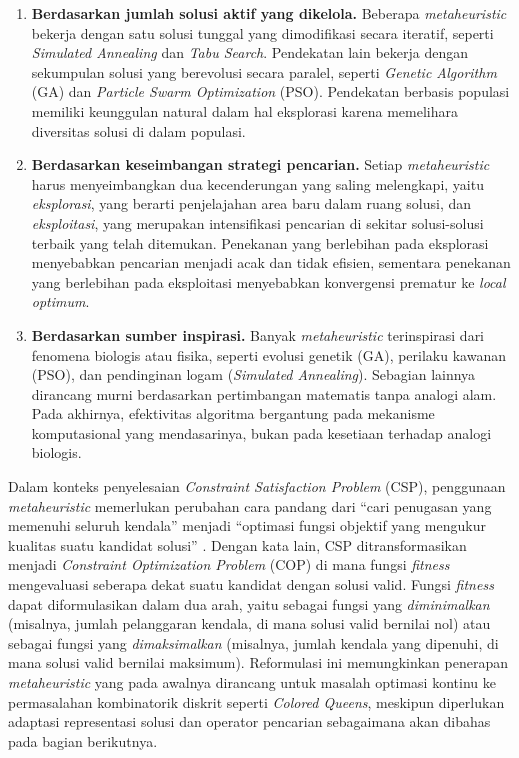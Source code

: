 \begin{enumerate}
	\item \textbf{Berdasarkan jumlah solusi aktif yang dikelola.} Beberapa \textit{metaheuristic} bekerja dengan satu solusi tunggal yang dimodifikasi secara iteratif, seperti \textit{Simulated Annealing} dan \textit{Tabu Search}. Pendekatan lain bekerja dengan sekumpulan solusi yang berevolusi secara paralel, seperti \textit{Genetic Algorithm} (GA) dan \textit{Particle Swarm Optimization} (PSO). Pendekatan berbasis populasi memiliki keunggulan natural dalam hal eksplorasi karena memelihara diversitas solusi di dalam populasi.
	\item \textbf{Berdasarkan keseimbangan strategi pencarian.} Setiap \textit{metaheuristic} harus menyeimbangkan dua kecenderungan yang saling melengkapi, yaitu \textit{eksplorasi}, yang berarti penjelajahan area baru dalam ruang solusi, dan \textit{eksploitasi}, yang merupakan intensifikasi pencarian di sekitar solusi-solusi terbaik yang telah ditemukan. Penekanan yang berlebihan pada eksplorasi menyebabkan pencarian menjadi acak dan tidak efisien, sementara penekanan yang berlebihan pada eksploitasi menyebabkan konvergensi prematur ke \textit{local optimum}.
	\item \textbf{Berdasarkan sumber inspirasi.} Banyak \textit{metaheuristic} terinspirasi dari fenomena biologis atau fisika, seperti evolusi genetik (GA), perilaku kawanan (PSO), dan pendinginan logam (\textit{Simulated Annealing}). Sebagian lainnya dirancang murni berdasarkan pertimbangan matematis tanpa analogi alam. Pada akhirnya, efektivitas algoritma bergantung pada mekanisme komputasional yang mendasarinya, bukan pada kesetiaan terhadap analogi biologis.
\end{enumerate}

Dalam konteks penyelesaian \textit{Constraint Satisfaction Problem} (CSP), penggunaan \textit{metaheuristic} memerlukan perubahan cara pandang dari ``cari penugasan yang memenuhi seluruh kendala'' menjadi ``optimasi fungsi objektif yang mengukur kualitas suatu kandidat solusi'' \cite{hoos2006local}. Dengan kata lain, CSP ditransformasikan menjadi \textit{Constraint Optimization Problem} (COP) di mana fungsi \textit{fitness} mengevaluasi seberapa dekat suatu kandidat dengan solusi valid. Fungsi \textit{fitness} dapat diformulasikan dalam dua arah, yaitu sebagai fungsi yang \textit{diminimalkan} (misalnya, jumlah pelanggaran kendala, di mana solusi valid bernilai nol) atau sebagai fungsi yang \textit{dimaksimalkan} (misalnya, jumlah kendala yang dipenuhi, di mana solusi valid bernilai maksimum). Reformulasi ini memungkinkan penerapan \textit{metaheuristic} yang pada awalnya dirancang untuk masalah optimasi kontinu ke permasalahan kombinatorik diskrit seperti \textit{Colored Queens}, meskipun diperlukan adaptasi representasi solusi dan operator pencarian sebagaimana akan dibahas pada bagian berikutnya.

